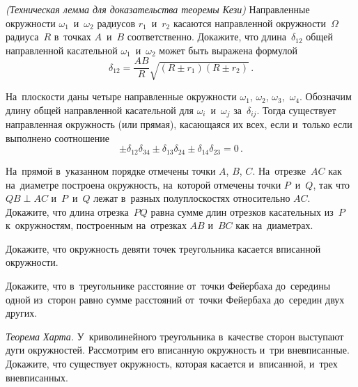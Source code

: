 



\begin{problems}

\item\emph{(Техническая лемма для доказательства теоремы Кези)}
Направленные окружности $\omega_1$~и~$\omega_2$ радиусов $r_1$~и~$r_2$ касаются
направленной окружности~$\Omega$ радиуса~$R$ в~точках $A$~и~$B$ соответственно.
Докажите, что длина~$\delta_{12}$ общей направленной касательной
$\omega_1$~и~$\omega_2$ может быть выражена формулой
\[
    \delta_{12}
=
    \frac{AB}{R} \sqrt{(R \pm r_1)(R \pm r_2)}
\, . \]

\item{}
На~плоскости даны четыре направленные окружности
$\omega_1$, $\omega_2$, $\omega_3$,~$\omega_4$.
Обозначим длину общей направленной касательной для $\omega_i$~и~$\omega_j$
за~$\delta_{ij}$.
Тогда существует направленная окружность (или прямая), касающаяся их всех, если
и~только если выполнено соотношение
\[
    \pm \delta_{12}\delta_{34}
    \pm \delta_{13}\delta_{24}
    \pm \delta_{14}\delta_{23}
=
    0
\, . \]

\item
На~прямой в~указанном порядке отмечены точки $A$, $B$, $C$.
На~отрезке~$AC$ как на~диаметре построена окружность, на~которой отмечены
точки $P$~и~$Q$, так что $QB \perp AC$ и~$P$~и~$Q$ лежат в~разных
полуплоскостях относительно $AC$.
Докажите, что длина отрезка~$PQ$ равна сумме длин отрезков касательных из~$P$
к~окружностям, построенным на~отрезках $AB$ и~$BC$ как на~диаметрах.

\item{}
Докажите, что окружность девяти точек треугольника касается вписанной
окружности.

\item
Докажите, что в~треугольнике расстояние от~точки Фейербаха до~середины одной
из~сторон равно сумме расстояний от~точки Фейербаха до~середин двух других.

\item\emph{Теорема Харта.}
У~криволинейного треугольника в~качестве сторон выступают дуги окружностей.
Рассмотрим его вписанную окружность и~три вневписанные.
Докажите, что существует окружность, которая касается и~вписанной, и~трех
вневписанных.


\end{problems}
